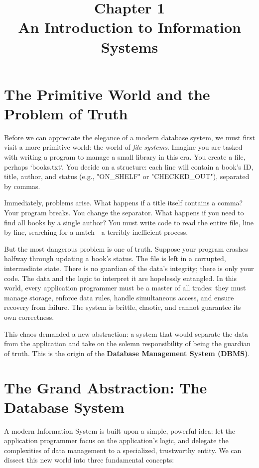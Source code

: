 \documentclass[12pt,a4paper]{article}
\begin{document}
\title{Chapter 1 \\ \large An Introduction to Information Systems}
\author{}
\date{}
\maketitle

\section{The Primitive World and the Problem of Truth}

Before we can appreciate the elegance of a modern database system, we must first visit a more primitive world: the world of \emph{file systems}. Imagine you are tasked with writing a program to manage a small library in this era. You create a file, perhaps `books.txt`. You decide on a structure: each line will contain a book's ID, title, author, and status (e.g., "ON\_SHELF" or "CHECKED\_OUT"), separated by commas.

Immediately, problems arise. What happens if a title itself contains a comma? Your program breaks. You change the separator. What happens if you need to find all books by a single author? You must write code to read the entire file, line by line, searching for a match---a terribly inefficient process.

But the most dangerous problem is one of truth. Suppose your program crashes halfway through updating a book's status. The file is left in a corrupted, intermediate state. There is no guardian of the data's integrity; there is only your code. The data and the logic to interpret it are hopelessly entangled. In this world, every application programmer must be a master of all trades: they must manage storage, enforce data rules, handle simultaneous access, and ensure recovery from failure. The system is brittle, chaotic, and cannot guarantee its own correctness.

This chaos demanded a new abstraction: a system that would separate the data from the application and take on the solemn responsibility of being the guardian of truth. This is the origin of the \textbf{Database Management System (DBMS)}.

\section{The Grand Abstraction: The Database System}

A modern Information System is built upon a simple, powerful idea: let the application programmer focus on the application's logic, and delegate the complexities of data management to a specialized, trustworthy entity. We can dissect this new world into three fundamental concepts:
\end{document}
